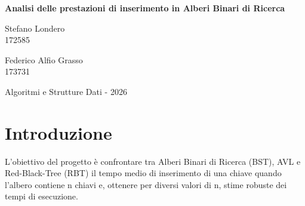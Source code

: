 \documentclass[10pt]{article}
\begin{document}
\begin{titlepage}
    \centering
    \vspace*{3cm} %
    
    {\Huge \bfseries Analisi delle prestazioni di inserimento in Alberi Binari di Ricerca \par}
    
    \vspace{2cm} %
    
    \noindent
    \begin{minipage}[t]{0.49\textwidth}
        \centering
        {\large Stefano Londero\\ 172585}
    \end{minipage}
    \hfill
    \begin{minipage}[t]{0.49\textwidth}
        \centering
        {\large Federico Alfio Grasso \\ 173731}
    \end{minipage}
    
    \vfill %
    
    {\large Algoritmi e Strutture Dati - 2026 \par}
    
    \vspace{2cm} %
\end{titlepage}

\newpage
\tableofcontents
\newpage

\section{Introduzione}
L'obiettivo del progetto è confrontare tra Alberi Binari di Ricerca (BST), AVL e Red-Black-Tree (RBT) il tempo medio di inserimento di una chiave quando l'albero contiene n chiavi e, ottenere per diversi valori di n, stime robuste dei tempi di esecuzione.
\end{document}
